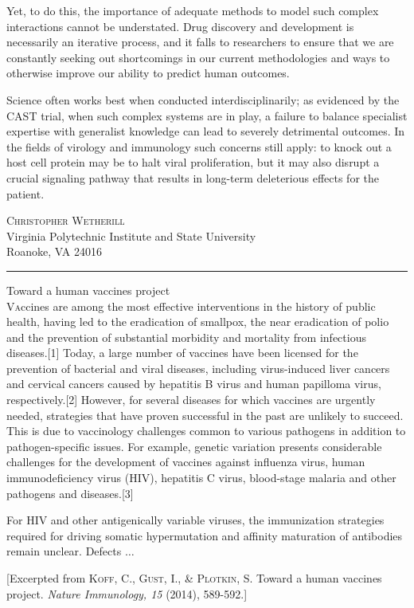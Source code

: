 \documentclass[11pt,final,twocolumn,twoside] {article}
\begin{document}
Yet, to do this, the importance of adequate methods to model such complex interactions cannot be understated. Drug discovery and development is necessarily an iterative process, and it falls to researchers to ensure that we are constantly seeking out shortcomings in our current methodologies and ways to otherwise improve our ability to predict human outcomes.

Science often works best when conducted interdisciplinarily; as evidenced by the CAST trial, when such complex systems are in play, a failure to balance specialist expertise with generalist knowledge can lead to severely detrimental outcomes. In the fields of virology and immunology such concerns still apply: to knock out a host cell protein may be to halt viral proliferation, but it may also disrupt a crucial signaling pathway that results in long-term deleterious effects for the patient.

\begin{flushright}
\textsc{Christopher Wetherill}\\
{\footnotesize Virginia Polytechnic Institute and State University}\\
{\footnotesize Roanoke, VA 24016}
\end{flushright}



\rule{3.2in}{1pt}
{\Large \noindent Toward a human vaccines project}\\

\noindent \lettrine[nindent=0em,lines=2]{V}accines are among the most effective interventions in the history of public health, having led to the eradication of smallpox, the near eradication of polio and the prevention of substantial morbidity and mortality from infectious diseases.[1] Today, a large number of vaccines have been licensed for the prevention of bacterial and viral diseases, including virus-induced liver cancers and cervical cancers caused by hepatitis B virus and human papilloma virus, respectively.[2] However, for several diseases for which vaccines are urgently needed, strategies that have proven successful in the past are unlikely to succeed. This is due to vaccinology challenges common to various pathogens in addition to pathogen-specific issues. For example, genetic variation presents considerable challenges for the development of vaccines against influenza virus, human immunodeficiency virus (HIV), hepatitis C virus, blood-stage malaria and other pathogens and diseases.[3]

For HIV and other antigenically variable viruses, the immunization strategies required for driving somatic hypermutation and affinity maturation of antibodies remain unclear. Defects $\ldots$

[Excerpted from \textsc{Koff, C., Gust, I., \& Plotkin, S.} Toward a human vaccines project. {\itshape Nature Immunology, 15} (2014), 589-592.]
\end{document}
